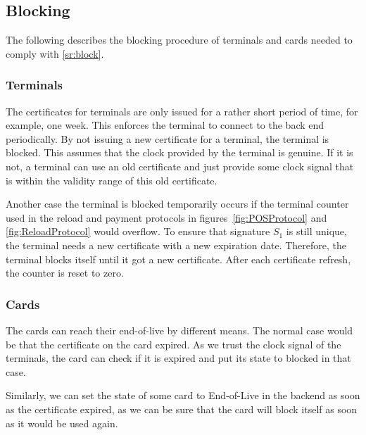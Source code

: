 \documentclass{article}
\begin{document}
\subsection{Blocking} \label{sec:blocking}
The following describes the blocking procedure of terminals and cards needed to comply with \ref{sr:block}.

\subsubsection{Terminals} \label{sec:blockTerminal}
The certificates for terminals are only issued for a rather short period of time, for example, one week.
This enforces the terminal to connect to the back end periodically.
By not issuing a new certificate for a terminal, the terminal is blocked.
This assumes that the clock provided by the terminal is genuine.
If it is not, a terminal can use an old certificate and just provide some clock signal that is within the validity range of this old certificate.

Another case the terminal is blocked temporarily occurs if the terminal counter used in the reload and payment protocols in figures~\ref{fig:POSProtocol} and \ref{fig:ReloadProtocol} would overflow.
To ensure that signature $S_1$ is still unique, the terminal needs a new certificate with a new expiration date.
Therefore, the terminal blocks itself until it got a new certificate.
After each certificate refresh, the counter is reset to zero.

\subsubsection{Cards} \label{sec:blockCards}
The cards can reach their end-of-live by different means.
The normal case would be that the certificate on the card expired.
As we trust the clock signal of the terminals, the card can check if it is expired and put its state to blocked in that case.

Similarly, we can set the state of some card to End-of-Live in the backend as soon as the certificate expired, as we can be sure that the card will block itself as soon as it would be used again.
\end{document}
